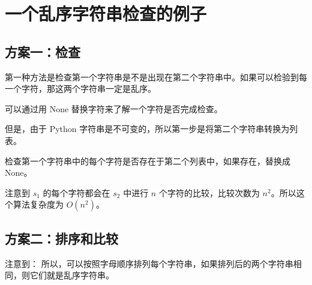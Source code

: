 \section{一个乱序字符串检查的例子}
\subsection{方案一：检查}
\begin{frame}\ft{\subsecname}
  第一种方法是检查第一个字符串是不是出现在第二个字符串中。如果可以检验到每一个字符，那这两个字符串一定是乱序。 \pause 

  可以通过用 None 替换字符来了解一个字符是否完成检查。\pause

  但是，由于 Python 字符串是不可变的，所以第一步是将第二个字符串转换为列表。\pause

  检查第一个字符串中的每个字符是否存在于第二个列表中，如果存在，替换成 None。 
\end{frame}

\begin{frame}\ft{\subsecname}

    

\end{frame}

\begin{frame}\ft{\subsecname}

注意到 $s_1$ 的每个字符都会在 $s_2$ 中进行 $n$ 个字符的比较，比较次数为 
$n^2$。所以这个算法复杂度为 $O(n^2 )$。
\end{frame}

\subsection{方案二：排序和比较}
\begin{frame}\ft{\subsecname}
注意到： 所以，可以按照字母顺序排列每个字符串，如果排列后的两个字符串相同，则它们就是乱序字符串。 \pause 

  
\end{frame}

